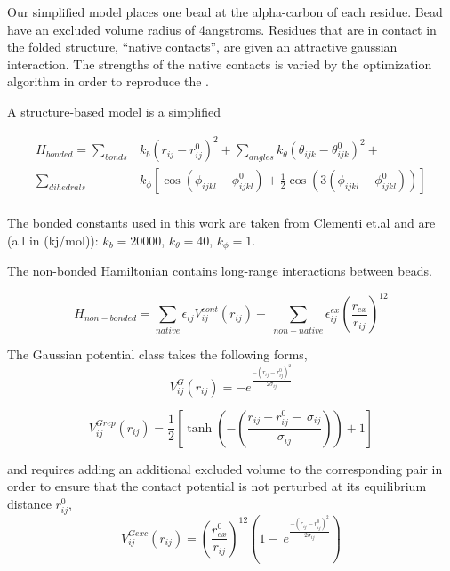\documentclass[preprint]{elsarticle}
\begin{document}
    Our simplified model places one bead at the alpha-carbon of each residue. Bead
have an excluded volume radius of 4angstroms. Residues that are in contact in
the folded structure, ``native contacts'', are given an attractive gaussian interaction. 
The strengths of the native contacts is varied by the optimization algorithm in order
to reproduce the .

A structure-based model is a simplified

\begin{align}
    H_{bonded} = \sum\limits_{bonds} &k_b (r_{ij} - r_{ij}^0)^2 + \sum\limits_{angles} k_{\theta} (\theta_{ijk} - \theta_{ijk}^0)^2 + \\
        \sum\limits_{dihedrals} &k_{\phi} [ \cos(\phi_{ijkl} - \phi_{ijkl}^0) + \frac{1}{2}\cos(3(\phi_{ijkl} - \phi_{ijkl}^0))] \\
\end{align}

    The bonded constants used in this work are taken from Clementi
et.al\cite{Clementi2000} and are (all in (kj/mol)): $k_b = 20000$, $k_{\theta}
= 40$, $k_{\phi} = 1$.

    The non-bonded Hamiltonian contains long-range interactions between beads.

\begin{equation}
    H_{non-bonded} = \sum\limits_{native} \epsilon_{ij} V^{cont}_{ij}(r_{ij}) + \
        \sum\limits_{non-native} \epsilon^{ex}_{ij}\left(\frac{r_{ex}}{r_{ij}}\right)^{12}
\end{equation}

    The Gaussian potential class takes the following forms,
\begin{equation}
    V^{G}_{ij}(r_{ij}) = - e^{\frac{-(r_{ij} - r_{ij}^0)^2}{2\sigma_{ij}}}
\end{equation}

\begin{equation}
    V^{Grep}_{ij}(r_{ij}) = \frac{1}{2}\left[ \tanh\left(-\left(\frac{r_{ij} - r_{ij}^0 -\
                                \sigma_{ij}}{\sigma_{ij}}\right)\right) + 1 \right]
\end{equation}

and requires adding an additional excluded volume to the corresponding pair in
order to ensure that the contact potential is not perturbed at its equilibrium
distance $r_{ij}^0$,
\begin{equation}
    V^{Gexc}_{ij}(r_{ij}) = \left(\frac{r_{ex}^0}{r_{ij}}\right)^{12}\left(1 - \
                    e^{\frac{-(r_{ij} - r_{ij}^0)^2}{2\sigma_{ij}}}\right)
\end{equation}
\end{document}
